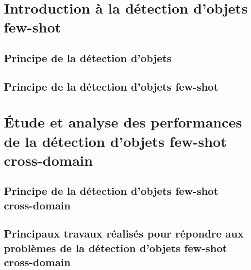 \documentclass[xcolor=table, 8pt]{beamer}
\begin{document}
    \maketitle
    


    \section{Introduction à la détection d'objets few-shot}\label{sec:od-fsod}

    \subsection{Principe de la détection d'objets}\label{subsec:object-detection}
    

    \subsection{Principe de la détection d'objets few-shot}\label{subsec:fs-od-definition}
    

%    
%    

    \section{Étude et analyse des performances de la détection d'objets few-shot cross-domain}\label{subsec:fs-od-cd}
    \subsection{Principe de la détection d'objets few-shot cross-domain}\label{subsec:fs-od-cd-principle}
    
    \subsection{Principaux travaux réalisés pour répondre aux problèmes de la détection d'objets few-shot cross-domain}\label{subsec:fs-od-cd-research}
    
\end{document}
